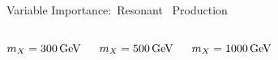 \documentclass[11pt, xcolor={dvipsnames}, aspectratio=169, notes]{beamer}
\begin{document}
\begin{frame}{Variable Importance:\ Resonant~\allbold{\HH} Production}

  \begin{columns}
    \centering\footnotesize

    $\mX = \SI{300}{\GeV}$

    \vspace*{1em}

    

    \centering\footnotesize

    $\mX = \SI{500}{\GeV}$

    \vspace*{1em}

    

    \centering\footnotesize

    $\mX = \SI{1000}{\GeV}$

    \vspace*{1em}

    
  \end{columns}
\end{frame}

\end{document}
